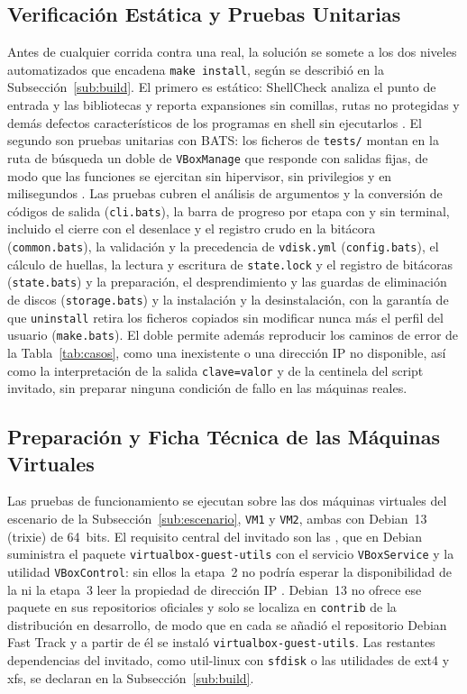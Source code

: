 \subsection{Verificación Estática y Pruebas Unitarias}
\label{sub:unitarias}

Antes de cualquier corrida contra una \vm{} real, la solución se somete a los dos niveles automatizados que encadena \texttt{make install}, según se describió en la Subsección~\ref{sub:build}. El primero es estático: ShellCheck analiza el punto de entrada y las bibliotecas y reporta expansiones sin comillas, rutas no protegidas y demás defectos característicos de los programas en shell sin ejecutarlos \parencite{shellcheck}. El segundo son pruebas unitarias con BATS: los ficheros de \texttt{tests/} montan en la ruta de búsqueda un doble de \texttt{VBoxManage} que responde con salidas fijas, de modo que las funciones se ejercitan sin hipervisor, sin privilegios y en milisegundos \parencite{bats_testing}. Las pruebas cubren el análisis de argumentos y la conversión de códigos de salida (\texttt{cli.bats}), la barra de progreso por etapa con y sin terminal, incluido el cierre con el desenlace y el registro crudo en la bitácora (\texttt{common.bats}), la validación y la precedencia de \texttt{vdisk.yml} (\texttt{config.bats}), el cálculo de huellas, la lectura y escritura de \texttt{state.lock} y el registro de bitácoras (\texttt{state.bats}) y la preparación, el desprendimiento y las guardas de eliminación de discos (\texttt{storage.bats}) y la instalación y la desinstalación, con la garantía de que \texttt{uninstall} retira los ficheros copiados sin modificar nunca más el perfil del usuario (\texttt{make.bats}). El doble permite además reproducir los caminos de error de la Tabla~\ref{tab:casos}, como una \vm{} inexistente o una dirección IP no disponible, así como la interpretación de la salida \texttt{clave=valor} y de la centinela del script invitado, sin preparar ninguna condición de fallo en las máquinas reales.

\subsection{Preparación y Ficha Técnica de las Máquinas Virtuales}
\label{sub:ficha}

Las pruebas de funcionamiento se ejecutan sobre las dos máquinas virtuales del escenario de la Subsección~\ref{sub:escenario}, \texttt{VM1} y \texttt{VM2}, ambas con Debian~13 (trixie) de 64~bits. El requisito central del invitado son las \guestadditions{}, que en Debian suministra el paquete \texttt{virtualbox-guest-utils} con el servicio \texttt{VBoxService} y la utilidad \texttt{VBoxControl}: sin ellos la etapa~2 no podría esperar la disponibilidad de la \vm{} ni la etapa~3 leer la propiedad de dirección IP \parencite{virtualbox_guestadditions}. Debian~13 no ofrece ese paquete en sus repositorios oficiales y solo se localiza en \texttt{contrib} de la distribución en desarrollo, de modo que en cada \vm{} se añadió el repositorio Debian Fast Track \parencite{debian_fasttrack} y a partir de él se instaló \texttt{virtualbox-guest-utils}. Las restantes dependencias del invitado, como util-linux con \texttt{sfdisk} o las utilidades de ext4 y xfs, se declaran en la Subsección~\ref{sub:build}.

